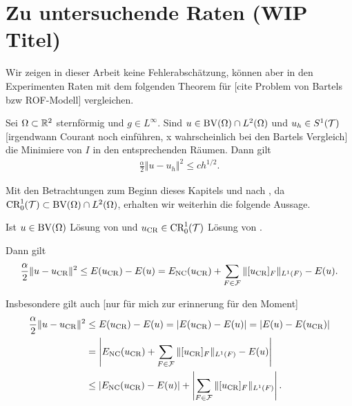\section{Zu untersuchende Raten (WIP Titel)}
Wir zeigen in dieser Arbeit keine Fehlerabschätzung, können aber in den 
Experimenten Raten mit dem folgenden Theorem für
[cite Problem von Bartels bzw ROF-Modell] vergleichen.
\begin{theorem}
  \label{thm:errorEstimateCourant}
  Sei $\Omega\subset\mathbb{R}^2$ sternförmig und $g\in L^\infty$.
  Sind $u\in\textup{BV}(\Omega)\cap L^2(\Omega)$ und $u_h\in S^1(\mathcal{T})$ [irgendwann
  Courant noch einführen, x wahrscheinlich bei den Bartels Vergleich] die 
  Minimiere von $I$ in den entsprechenden Räumen.
  Dann gilt 
  \begin{align*}
    \frac{\alpha}{2}\Vert u-u_h\Vert^2\leq
    ch^{1/2}.
  \end{align*}
\end{theorem}

Mit den Betrachtungen zum Beginn dieses Kapitels und nach 
, da $\textup{CR}^1_0(\mathcal{T})\subset\textup{BV}(\Omega)\cap L^2(\Omega)$,
erhalten wir weiterhin die folgende Aussage.

\begin{corollary}
  Ist $u\in\textup{BV}(\Omega)$ Lösung von  und
  $u_\textup{CR}\in\textup{CR}^1_0(\mathcal{T})$ Lösung von .

  Dann gilt
  \begin{align*}
    \frac{\alpha}{2}\Vert u-u_\textup{CR}\Vert^2\leq
    E(u_\textup{CR})-E(u)=E_\textup{NC}(u_\textup{CR})+\sum_{F\in\mathcal{F}}\Vert[u_\textup{CR}]_F\Vert_{L^1(F)}-E(u).
  \end{align*}

  Insbesondere gilt auch  [nur für mich zur erinnerung für den Moment]
  \begin{align*}
    \frac{\alpha}{2}\Vert u-u_\textup{CR}\Vert^2&\leq
    E(u_\textup{CR})-E(u)=
    |E(u_\textup{CR})-E(u)|=
    |E(u)-E(u_\textup{CR})|\\
    &=\left|E_\textup{NC}(u_\textup{CR})+\sum_{F\in\mathcal{F}}\Vert[u_\textup{CR}]_F\Vert_{L^1(F)}-E(u)\right|\\
    &\leq
    \left|E_\textup{NC}(u_\textup{CR})-E(u)\right|+
    \left|\sum_{F\in\mathcal{F}}\Vert[u_\textup{CR}]_F\Vert_{L^1(F)}\right|.
  \end{align*}
\end{corollary}

